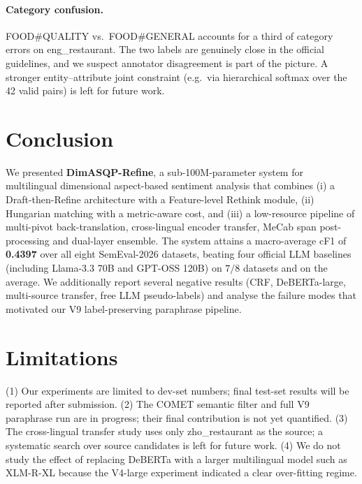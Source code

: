 \documentclass[11pt]{article}
\begin{document}
\paragraph{Category confusion.}
FOOD\#QUALITY vs.\ FOOD\#GENERAL accounts for a third of category
errors on eng\_restaurant. The two labels are genuinely close in the
official guidelines, and we suspect annotator disagreement is part of
the picture. A stronger entity--attribute joint constraint (e.g.\ via
hierarchical softmax over the 42 valid pairs) is left for future
work.

\section{Conclusion}
\label{sec:conclusion}

We presented \textbf{DimASQP-Refine}, a sub-100M-parameter system for
multilingual dimensional aspect-based sentiment analysis that combines
(i) a Draft-then-Refine architecture with a Feature-level Rethink
module, (ii) Hungarian matching with a metric-aware cost, and (iii)
a low-resource pipeline of multi-pivot back-translation, cross-lingual
encoder transfer, MeCab span post-processing and dual-layer ensemble.
The system attains a macro-average cF1 of \textbf{0.4397} over all
eight SemEval-2026 datasets, beating four official LLM baselines
(including Llama-3.3 70B and GPT-OSS 120B) on $7/8$ datasets and on
the average. We additionally report several negative results (CRF,
DeBERTa-large, multi-source transfer, free LLM pseudo-labels) and
analyse the failure modes that motivated our V9 label-preserving
paraphrase pipeline.

\section*{Limitations}

(1) Our experiments are limited to dev-set numbers; final test-set
results will be reported after submission. (2) The COMET semantic
filter and full V9 paraphrase run are in progress; their final
contribution is not yet quantified. (3) The cross-lingual transfer
study uses only zho\_restaurant as the source; a systematic search
over source candidates is left for future work. (4) We do not study
the effect of replacing DeBERTa with a larger multilingual model such
as XLM-R-XL because the V4-large experiment indicated a clear
over-fitting regime.
\end{document}
